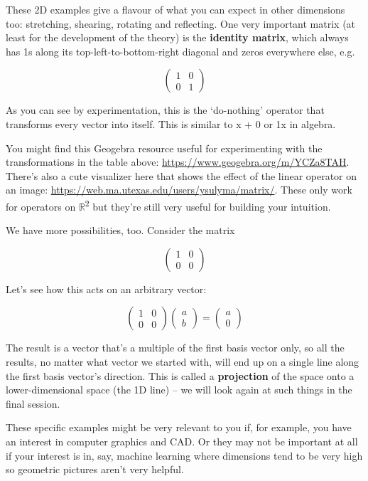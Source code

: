 \documentclass[oneside,english]{amsbook}
\numberwithin{section}{chapter}
\theoremstyle{plain}
\theoremstyle{definition}
\begin{document}
These 2D examples give a flavour of what you can expect in other
dimensions too: stretching, shearing, rotating and reflecting. One very
important matrix (at least for the development of the theory) is the
\textbf{identity matrix}, which always has 1s along its
top-left-to-bottom-right diagonal and zeros everywhere else, e.g.

\[\begin{pmatrix}
	1 & 0 \\
	0 & 1
\end{pmatrix}\]

As you can see by experimentation, this is the `do-nothing' operator
that transforms every vector into itself. This is similar to x + 0 or 1x
in algebra.

You might find this Geogebra resource useful for experimenting with the
transformations in the table above:
\url{https://www.geogebra.org/m/YCZa8TAH}. There's also a cute
visualizer here that shows the effect of the linear operator on an
image: \url{https://web.ma.utexas.edu/users/ysulyma/matrix/}. These only
work for operators on $\mathbb{R}$\textsuperscript{2} but they're still
very useful for building your intuition.

We have more possibilities, too. Consider the matrix

\[\begin{pmatrix}
	1 & 0 \\
	0 & 0
\end{pmatrix}\]

Let's see how this acts on an arbitrary vector:

\[\begin{pmatrix}
	1 & 0 \\
	0 & 0
\end{pmatrix}\begin{pmatrix}
	a \\
	b
\end{pmatrix} = \begin{pmatrix}
	a \\
	0
\end{pmatrix}\]

The result is a vector that's a multiple of the first basis vector only,
so all the results, no matter what vector we started with, will end up
on a single line along the first basis vector's direction. This is
called a \textbf{projection} of the space onto a lower-dimensional space
(the 1D line) -- we will look again at such things in the final session.

These specific examples might be very relevant to you if, for example,
you have an interest in computer graphics and CAD. Or they may not be
important at all if your interest is in, say, machine learning where
dimensions tend to be very high so geometric pictures aren't very
helpful.
\end{document}
